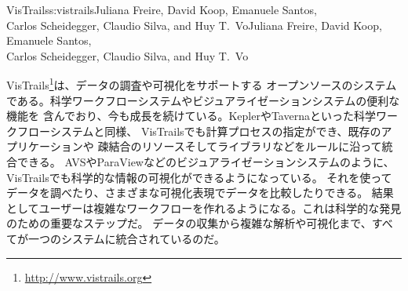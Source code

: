 \begin{aosachaptertoc}{VisTrails}{s:vistrails}{Juliana Freire, David Koop, Emanuele Santos, \\ Carlos Scheidegger, Claudio Silva, and Huy T.\ Vo}{Juliana Freire, David Koop, Emanuele Santos, \\ \hspace*{0.9cm} Carlos Scheidegger, Claudio Silva, and Huy T.\ Vo}

VisTrails\footnote{\url{http://www.vistrails.org}}は、データの調査や可視化をサポートする
オープンソースのシステムである。科学ワークフローシステムやビジュアライゼーションシステムの便利な機能を
含んでおり、今も成長を続けている。KeplerやTavernaといった科学ワークフローシステムと同様、
VisTrailsでも計算プロセスの指定ができ、既存のアプリケーションや
疎結合のリソースそしてライブラリなどをルールに沿って統合できる。
AVSやParaViewなどのビジュアライゼーションシステムのように、
VisTrailsでも科学的な情報の可視化ができるようになっている。
それを使ってデータを調べたり、さまざまな可視化表現でデータを比較したりできる。
結果としてユーザーは複雑なワークフローを作れるようになる。これは科学的な発見のための重要なステップだ。
データの収集から複雑な解析や可視化まで、すべてが一つのシステムに統合されているのだ。


\end{aosachaptertoc}
